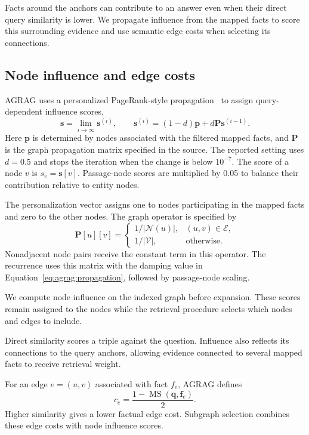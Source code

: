 Facts around the anchors can contribute to an answer even when their direct query similarity is lower. We propagate influence from the mapped facts to score this surrounding evidence and use semantic edge costs when selecting its connections.

\subsection{Node influence and edge costs}
AGRAG uses a personalized PageRank-style propagation~\cite{agrag-haveliwala2002topic} to assign query-dependent influence scores,
\begin{equation}
\mathbf{s}=\lim_{i\rightarrow\infty}\mathbf{s}^{(i)},\qquad
\mathbf{s}^{(i)}=(1-d)\mathbf{p}+d\mathbf{P}\mathbf{s}^{(i-1)}.
\label{eq:agrag:propagation}
\end{equation}
Here $\mathbf{p}$ is determined by nodes associated with the filtered mapped facts, and $\mathbf{P}$ is the graph propagation matrix specified in the source. The reported setting uses $d=0.5$ and stops the iteration when the change is below $10^{-7}$. The score of a node $v$ is $s_v=\mathbf{s}[v]$. Passage-node scores are multiplied by 0.05 to balance their contribution relative to entity nodes.

The personalization vector assigns one to nodes participating in the mapped facts and zero to the other nodes. The graph operator is specified by
\begin{equation}
\mathbf{P}[u][v]=
\begin{cases}
1/|\mathcal{N}(u)|,&(u,v)\in\mathcal{E},\\
1/|\mathcal{V}|,&\text{otherwise}.
\end{cases}
\label{eq:agrag:graph-operator}
\end{equation}
Nonadjacent node pairs receive the constant term in this operator. The recurrence uses this matrix with the damping value in Equation~\ref{eq:agrag:propagation}, followed by passage-node scaling.

We compute node influence on the indexed graph before expansion. These scores remain assigned to the nodes while the retrieval procedure selects which nodes and edges to include.

Direct similarity scores a triple against the question. Influence also reflects its connections to the query anchors, allowing evidence connected to several mapped facts to receive retrieval weight.

For an edge $e=(u,v)$ associated with fact $f_e$, AGRAG defines
\begin{equation}
c_e=\frac{1-\operatorname{MS}(\mathbf{q},\mathbf{f}_e)}{2}.
\label{eq:agrag:edge-cost}
\end{equation}
Higher similarity gives a lower factual edge cost. Subgraph selection combines these edge costs with node influence scores.


